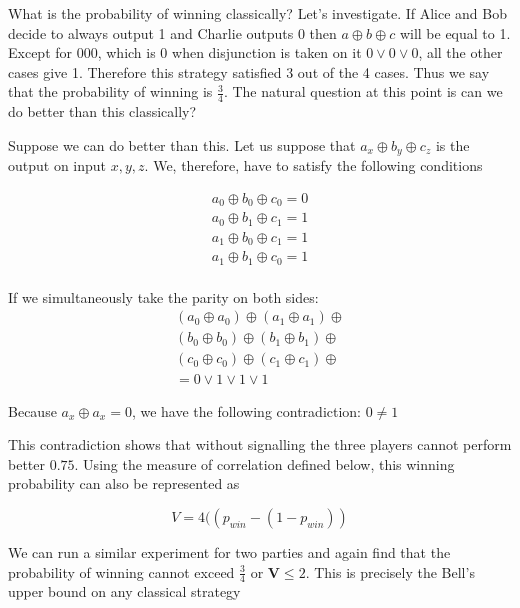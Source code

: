 \documentclass[aps,prl,twocolumn,groupedaddress]{revtex4}
\begin{document}
What is the probability of winning classically? Let's investigate. If Alice and Bob decide to always output 1 and Charlie outputs 0 then $a \oplus b \oplus c$ will be equal to 1. Except for 000, which is 0 when disjunction is taken on it $0 \vee 0 \vee 0$, all the other cases give 1. Therefore this strategy satisfied 3 out of the 4 cases. Thus we say that the probability of winning is $\frac{3}{4}$. The natural question at this point is can we do better than this classically? 

Suppose we can do better than this. Let us suppose that $a_x \oplus b_y \oplus c_z $  is the output on input $x,y,z$. We, therefore, have to satisfy the following conditions 

\begin{align*}
a_0 \oplus b_0 \oplus c_0 = 0 \\
a_0 \oplus b_1 \oplus c_1 = 1 \\
a_1 \oplus b_0 \oplus c_1 = 1 \\
a_1 \oplus b_1 \oplus c_0 = 1 \\ 
\end{align*}



If we simultaneously take the parity on both sides:\\

\begin{align*}
 (a_0 \oplus a_0) \oplus (a_1 \oplus a_1) \oplus\\ 
 (b_0 \oplus b_0) \oplus (b_1 \oplus b_1) \oplus\\
 (c_0 \oplus c_0) \oplus (c_1 \oplus c_1) \oplus\\
  = 0 \vee 1 \vee 1 \vee 1   
\end{align*}



Because $a_x \oplus a_x = 0$, we have the following contradiction: $0 \neq 1$

This contradiction shows that without signalling the three players cannot perform better $0.75$. Using the measure of correlation defined below, this winning probability can also be represented as



\begin{displaymath}
V = 4((p_{win} - (1 - p_{win})) 
\end{displaymath}

We can run a similar experiment for two parties and again find that the probability of winning cannot exceed $\frac{3}{4}$ or $\textbf{V} \leq 2$. This is precisely the Bell's upper bound on any classical strategy 
\end{document}
